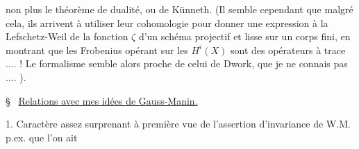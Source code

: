 non plus le théorème de dualité, ou de Künneth. 
(Il semble cependant que malgré cela, ils arrivent à utiliser leur cohomologie pour donner une expression à la Lefschetz-Weil de la fonction $\zeta$ d'un schéma projectif et lisse sur un corps fini, en montrant que les Frobenius opérant sur les $H^i(X)$ sont des opérateurs à trace .... ! Le formalisme semble alors proche de celui de Dwork, que je ne connais pas .... ).

\S\   \uline{Relations  avec mes idées de Gauss-Manin.}

1. Caractère assez surprenant à première vue de l'assertion d'invariance de W.M.  p.ex. que l'on ait

